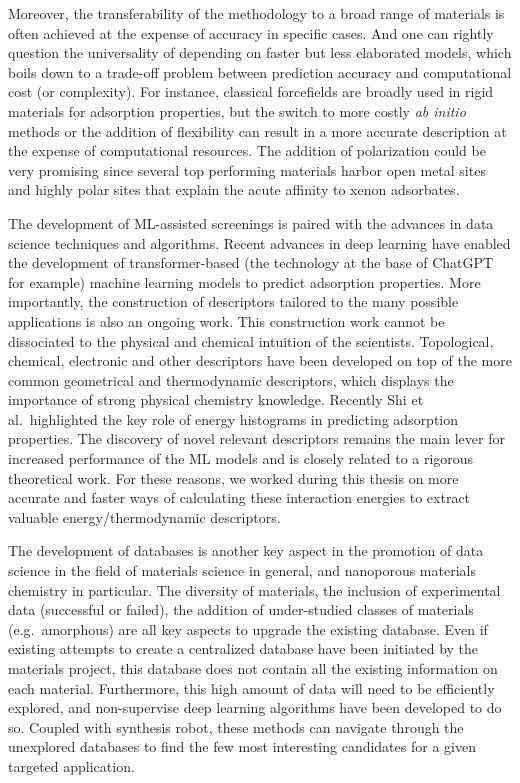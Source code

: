 \documentclass[main.tex]{subfiles}
\begin{document}
Moreover, the transferability of the methodology to a broad range of materials is often achieved at the expense of accuracy in specific cases. And one can rightly question the universality of depending on faster but less elaborated models, which boils down to a trade-off problem between prediction accuracy and computational cost (or complexity). For instance, classical forcefields are broadly used in rigid materials for adsorption properties, but the switch to more costly \emph{ab initio} methods or the addition of flexibility can result in a more accurate description at the expense of computational resources. The addition of polarization could be very promising since several top performing materials harbor open metal sites and highly polar sites that explain the acute affinity to xenon adsorbates. 

The development of ML-assisted screenings is paired with the advances in data science techniques and algorithms. Recent advances in deep learning have enabled the development of transformer-based (the technology at the base of ChatGPT for example) machine learning models to predict adsorption properties.\cite{Kang_2023,Cao_2023} More importantly, the construction of descriptors tailored to the many possible applications is also an ongoing work. This construction work cannot be dissociated to the physical and chemical intuition of the scientists. Topological, chemical, electronic and other descriptors have been developed on top of the more common geometrical and thermodynamic descriptors, which displays the importance of strong physical chemistry knowledge. Recently Shi et al.\ highlighted the key role of energy histograms in predicting adsorption properties.\cite{Shi_2023}
The discovery of novel relevant descriptors remains the main lever for increased performance of the ML models and is closely related to a rigorous theoretical work.
For these reasons, we worked during this thesis on more accurate and faster ways of calculating these interaction energies to extract valuable energy/thermodynamic descriptors.


The development of databases is another key aspect in the promotion of data science in the field of materials science in general, and nanoporous materials chemistry in particular. The diversity of materials, the inclusion of experimental data (successful or failed), the addition of under-studied classes of materials (e.g.\ amorphous) are all key aspects to upgrade the existing database. Even if existing attempts to create a centralized database have been initiated by the materials project,\cite{MaterialsProject} this database does not contain all the existing information on each material. Furthermore, this high amount of data will need to be efficiently explored, and non-supervise deep learning algorithms have been developed to do so.\cite{Park_2023} Coupled with synthesis robot, these methods can navigate through the unexplored databases to find the few most interesting candidates for a given targeted application.
\end{document}
